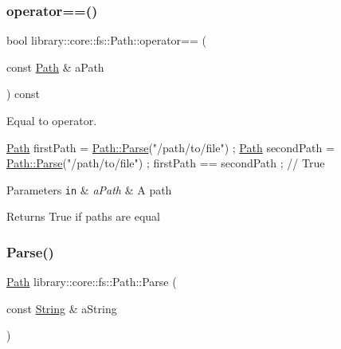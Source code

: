 \subsubsection{\texorpdfstring{operator==()}{operator==()}}
{\footnotesize\ttfamily bool library\+::core\+::fs\+::\+Path\+::operator== (\begin{DoxyParamCaption}\item[{const \hyperlink{classlibrary_1_1core_1_1fs_1_1_path}{Path} \&}]{a\+Path }\end{DoxyParamCaption}) const}



Equal to operator. 


\begin{DoxyCode}
\hyperlink{classlibrary_1_1core_1_1fs_1_1_path_aabc4240fc08479d1bff6b9753f2b5cc2}{Path} firstPath = \hyperlink{classlibrary_1_1core_1_1fs_1_1_path_a6ba644b6609507e724c217bf2020f5ae}{Path::Parse}(\textcolor{stringliteral}{"/path/to/file"}) ;
\hyperlink{classlibrary_1_1core_1_1fs_1_1_path_aabc4240fc08479d1bff6b9753f2b5cc2}{Path} secondPath = \hyperlink{classlibrary_1_1core_1_1fs_1_1_path_a6ba644b6609507e724c217bf2020f5ae}{Path::Parse}(\textcolor{stringliteral}{"/path/to/file"}) ;
firstPath == secondPath ; \textcolor{comment}{// True}
\end{DoxyCode}



\begin{DoxyParams}[1]{Parameters}
\mbox{\tt in}  & {\em a\+Path} & A path \\
\hline
\end{DoxyParams}
\begin{DoxyReturn}{Returns}
True if paths are equal 
\end{DoxyReturn}
\mbox{\label{classlibrary_1_1core_1_1fs_1_1_path_a6ba644b6609507e724c217bf2020f5ae}} 
\subsubsection{\texorpdfstring{Parse()}{Parse()}}
{\footnotesize\ttfamily \hyperlink{classlibrary_1_1core_1_1fs_1_1_path}{Path} library\+::core\+::fs\+::\+Path\+::\+Parse (\begin{DoxyParamCaption}\item[{const \hyperlink{classlibrary_1_1core_1_1types_1_1_string}{String} \&}]{a\+String }\end{DoxyParamCaption})\hspace{0.3cm}{\ttfamily [static]}}



